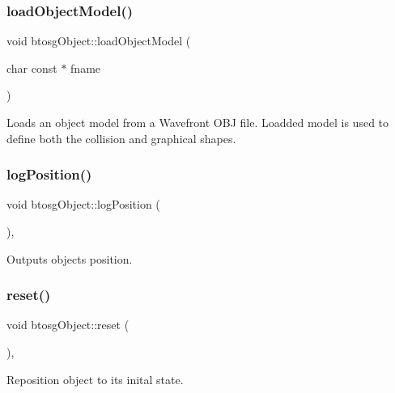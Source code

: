 \subsubsection{\texorpdfstring{load\+Object\+Model()}{loadObjectModel()}}
{\footnotesize\ttfamily void btosg\+Object\+::load\+Object\+Model (\begin{DoxyParamCaption}\item[{char const $\ast$}]{fname }\end{DoxyParamCaption})\hspace{0.3cm}{\ttfamily [inherited]}}

Loads an object model from a Wavefront O\+BJ file. Loadded model is used to define both the collision and graphical shapes. \mbox{\label{classbtosgObject_acfd70fa6477c80fd7f29ad7ab9f4f067}} 
\subsubsection{\texorpdfstring{log\+Position()}{logPosition()}}
{\footnotesize\ttfamily void btosg\+Object\+::log\+Position (\begin{DoxyParamCaption}{ }\end{DoxyParamCaption})\hspace{0.3cm}{\ttfamily [inline]}, {\ttfamily [inherited]}}

Outputs object\textquotesingle{}s position. \mbox{\label{classbtosgObject_a93983f9180dd0672f8779cf2baa78580}} 
\subsubsection{\texorpdfstring{reset()}{reset()}}
{\footnotesize\ttfamily void btosg\+Object\+::reset (\begin{DoxyParamCaption}{ }\end{DoxyParamCaption})\hspace{0.3cm}{\ttfamily [inline]}, {\ttfamily [inherited]}}

Reposition object to its inital state. \mbox{\label{classbtosgObject_ad1508a0ce28cfac83e5f0ff6245f91b5}} 
